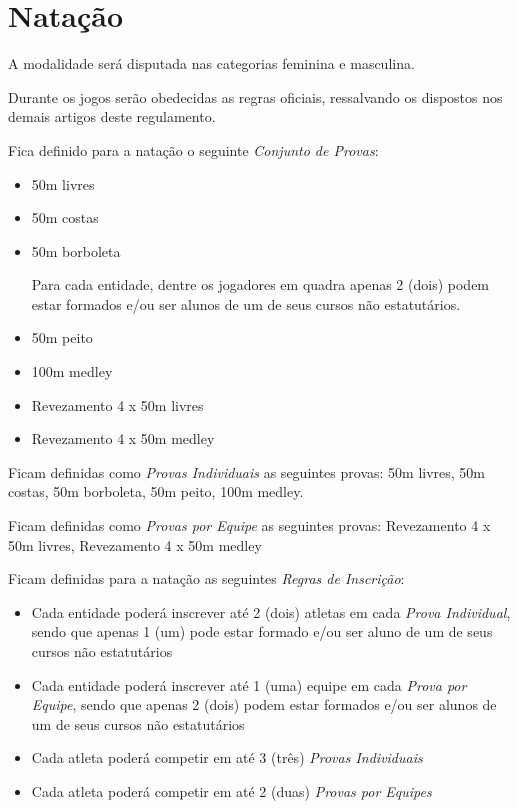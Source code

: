 {\let\clearpage\relax \chapter{Natação}}

\begin{article}
	A modalidade será disputada nas categorias feminina e masculina.
\end{article}

\begin{article}
	Durante os jogos serão obedecidas as regras oficiais, ressalvando os dispostos nos demais artigos deste regulamento.

	Fica definido para a natação o seguinte \textit{Conjunto de Provas}:
	\begin{itemize}[noitemsep]
		\item 50m livres
		\item 50m costas
		\item 50m borboleta

\begin{article}
	Para cada entidade, dentre os jogadores em quadra apenas 2 (dois) podem estar formados e/ou ser alunos de um de seus cursos não estatutários.
\end{article}
		\item 50m peito
		\item 100m medley
		\item Revezamento 4 x 50m livres
		\item Revezamento 4 x 50m medley
	\end{itemize}

	\begin{xparagraph}
		Ficam definidas como \textit{Provas Individuais} as seguintes provas: 50m livres, 50m costas, 50m borboleta, 50m peito, 100m medley.
	\end{xparagraph}

	\begin{xparagraph}
		Ficam definidas como \textit{Provas por Equipe} as seguintes provas: Revezamento 4 x 50m livres, Revezamento 4 x 50m medley
	\end{xparagraph}
\end{article}

\noindent
Ficam definidas para a natação as seguintes \textit{Regras de Inscrição}:
\begin{itemize}[noitemsep]
	\item Cada entidade poderá inscrever até 2 (dois) atletas em cada \textit{Prova Individual}, sendo que apenas 1 (um) pode estar formado e/ou ser aluno de um de seus cursos não estatutários
	\item Cada entidade poderá inscrever até 1 (uma) equipe em cada \textit{Prova por Equipe}, sendo que apenas 2 (dois) podem estar formados e/ou ser alunos de um de seus cursos não estatutários
	\item Cada atleta poderá competir em até 3 (três) \textit{Provas Individuais}
	\item Cada atleta poderá competir em até 2 (duas) \textit{Provas por Equipes}
\end{itemize}

